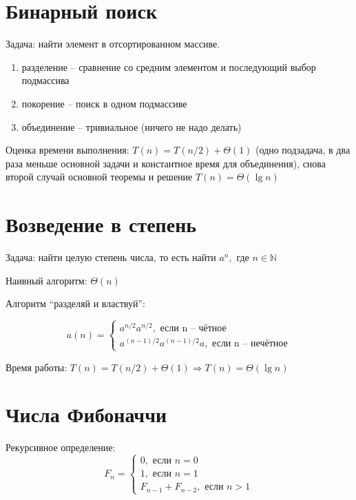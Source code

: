 \documentclass[a4paper,11pt]{article}
\begin{document}
\section{Бинарный поиск}

Задача: найти элемент в отсортированном массиве.

\begin{enumerate}
\item разделение -- сравнение со средним элементом и последующий выбор
  подмассива
\item покорение -- поиск в одном подмассиве
\item объединение -- тривиальное (ничего не надо делать)
\end{enumerate}

Оценка времени выполнения: $T(n) = T(n/2) + \Theta(1)$ (одно подзадача, в два
раза меньше основной задачи и константное время для объединения), снова второй
случай основной теоремы и решение $T(n) = \Theta(\lg n)$

\section{Возведение в степень}

Задача: найти целую степень числа, то есть найти $a^n, \text{ где } n \in
\mathbb{N}$

Наивный алгоритм: $\Theta(n)$

Алгоритм ``разделяй и властвуй'':

\begin{equation*}
  a(n) = \begin{cases}
  a^{n/2} a^{n/2}, \text{ если n -- чётное} \\
  a^{(n-1)/2} a^{(n-1)/2} a,  \text{ если n -- нечётное}
  \end{cases}
\end{equation*}

Время работы: $T(n) = T(n/2) + \Theta(1) \Rightarrow T(n) = \Theta(\lg n)$

\section{Числа Фибоначчи}

Рекурсивное определение:
\begin{equation*}
  F_n = \begin{cases}
  0, \text{ если } n = 0 \\
  1, \text{ если } n = 1 \\
  F_{n-1} + F_{n-2}, \text{ если } n > 1
  \end{cases}
\end{equation*}
\end{document}
